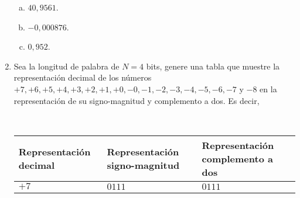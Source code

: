 \documentclass[
	spanish,
	9pt,
	utf8,
	xcolor=table,
	handout,
	aspectratio=1610,
	professionalfonts,
	notheorems,
	mathserif,
]{beamer}
\newcounter{savedenum}
\newcommand*{\saveenum}{\setcounter{savedenum}{\theenumi}}
\begin{document}
\begin{frame}
\begin{enumerate}
\begin{multicols}{4}
\begin{enumerate}[a)]
				      \item
				            $40,9561$.

				      \item
				            $-0,000876$.

				      \item
				            $0,952$.
			      \end{enumerate}
		      \end{multicols}

		\item
		      Sea la longitud de palabra de $N=4$ bits, genere una tabla que muestre la representación decimal de los números $+7,+6,+5,+4,+3,+2,+1,+0,-0,-1,-2,-3,-4,-5,-6,-7$ y $-8$ en la representación de su signo-magnitud y complemento a dos.
		      Es decir,

		      \

		      \begin{table}[ht!]
			      \centering
			      \begin{tabular}{|x{2.5cm}|x{2.5cm}|x{3.1cm}|}
				      \hline
				      Representación decimal & Representación signo-magnitud & Representación complemento a dos \\
				      \hline$+7$             & $0111$                        & $0111$                           \\
				      \hline
			      \end{tabular}
		      \end{table}

		      \saveenum
	\end{enumerate}
\end{frame}
\end{document}
